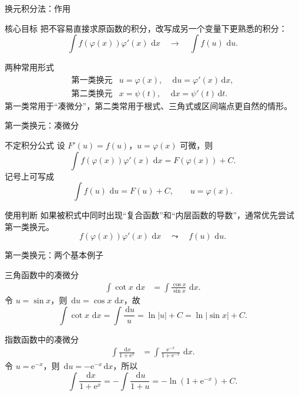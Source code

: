 \documentclass[aspectratio=169,10pt]{ctexbeamer}
\newcommand{\dd}{\,\mathrm{d}}
\newcommand{\ee}{\mathrm{e}}
\begin{document}
\begin{frame}[t]{换元积分法：作用}
\small
\begin{block}{核心目标}
把不容易直接求原函数的积分，改写成另一个变量下更熟悉的积分：
\[
  \int f(\varphi(x))\varphi'(x)\,\dd x
  \quad\longrightarrow\quad
  \int f(u)\,\dd u.
\]
\end{block}

\begin{block}{两种常用形式}
\[
\begin{array}{ll}
\text{第一类换元} & u=\varphi(x),\quad \dd u=\varphi'(x)\dd x,\\[2mm]
\text{第二类换元} & x=\psi(t),\quad \dd x=\psi'(t)\dd t.
\end{array}
\]
第一类常用于“凑微分”，第二类常用于根式、三角式或区间端点更自然的情形。
\end{block}
\end{frame}

\begin{frame}[t]{第一类换元：凑微分}
\small
\begin{block}{不定积分公式}
设 $F'(u)=f(u)$，$u=\varphi(x)$ 可微，则
\[
  \int f(\varphi(x))\varphi'(x)\,\dd x
  =F(\varphi(x))+C.
\]
记号上可写成
\[
  \int f(u)\,\dd u=F(u)+C,\qquad u=\varphi(x).
\]
\end{block}

\begin{block}{使用判断}
如果被积式中同时出现“复合函数”和“内层函数的导数”，通常优先尝试第一类换元。
\[
  f(\varphi(x))\varphi'(x)\,\dd x
  \quad\leadsto\quad
  f(u)\,\dd u.
\]
\end{block}
\end{frame}

\begin{frame}[t]{第一类换元：两个基本例子}
\small
\begin{block}{三角函数中的凑微分}
\[
\begin{aligned}
\int \cot x\,\dd x
&=\int \frac{\cos x}{\sin x}\,\dd x.
\end{aligned}
\]
令 $u=\sin x$，则 $\dd u=\cos x\,\dd x$，故
\[
  \int \cot x\,\dd x
  =\int \frac{\dd u}{u}
  =\ln|u|+C=\ln|\sin x|+C.
\]
\end{block}

\begin{block}{指数函数中的凑微分}
\[
\begin{aligned}
\int\frac{\dd x}{1+\ee^x}
&=\int\frac{\ee^{-x}}{1+\ee^{-x}}\,\dd x.
\end{aligned}
\]
令 $u=\ee^{-x}$，则 $\dd u=-\ee^{-x}\dd x$，所以
\[
  \int\frac{\dd x}{1+\ee^x}
  =-\int\frac{\dd u}{1+u}
  =-\ln(1+\ee^{-x})+C.
\]
\end{block}
\end{frame}
\end{document}
